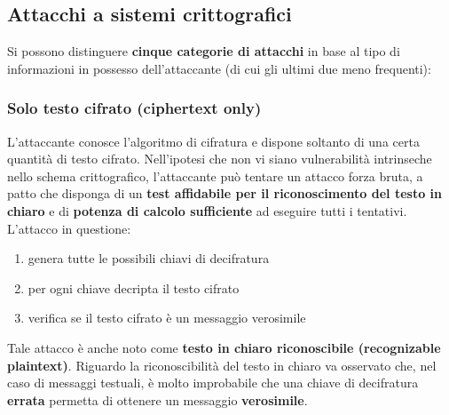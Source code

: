 \subsection{Attacchi a sistemi crittografici}
Si possono distinguere \textbf{cinque categorie di attacchi} in base al tipo di informazioni in possesso dell'attaccante (di cui gli ultimi due meno frequenti):

\subsubsection{Solo testo cifrato (ciphertext only)}
L'attaccante conosce l'algoritmo di cifratura e dispone soltanto di una certa quantità di testo cifrato. Nell'ipotesi che non vi siano vulnerabilità intrinseche nello schema crittografico, l'attaccante può tentare un attacco forza bruta, a patto che disponga di un \textbf{test affidabile per il riconoscimento del testo in chiaro} e di \textbf{potenza di calcolo sufficiente} ad eseguire tutti i tentativi. L'attacco in questione:
\begin{enumerate}
  \item genera tutte le possibili chiavi di decifratura
  \item per ogni chiave decripta il testo cifrato
  \item verifica se il testo cifrato è un messaggio verosimile
\end{enumerate} 

Tale attacco è anche noto come \textbf{testo in chiaro riconoscibile (recognizable plaintext)}. Riguardo la riconoscibilità del testo in chiaro va osservato che, nel caso di messaggi testuali, è molto improbabile che una chiave di decifratura \textbf{errata} permetta di ottenere un messaggio \textbf{verosimile}. \\

